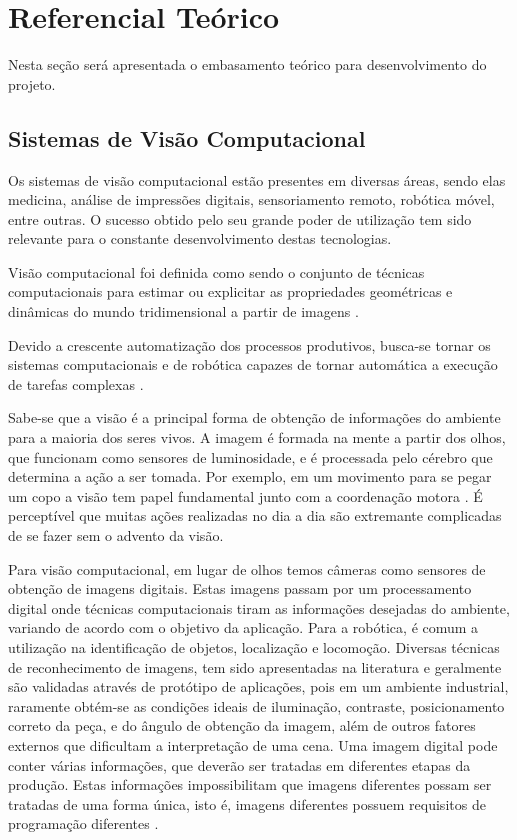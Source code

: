 \chapter{Referencial Teórico}
\label{chap:refteorico}

Nesta seção será apresentada o embasamento teórico para desenvolvimento do projeto.

\section{Sistemas de Visão Computacional}
\label{sec:sistemasVisaoArtificial}

Os sistemas de visão computacional estão presentes em diversas áreas, sendo elas medicina, análise de impressões digitais, sensoriamento remoto, robótica móvel, entre outras. O sucesso obtido pelo seu grande poder de utilização tem sido relevante para o constante desenvolvimento destas tecnologias.

Visão computacional foi definida como sendo o conjunto de técnicas computacionais para estimar ou explicitar as propriedades geométricas e dinâmicas do mundo tridimensional a partir de imagens \cite{alves2005estudo}.

Devido a crescente automatização dos processos produtivos, busca-se tornar os sistemas computacionais e de robótica capazes de tornar automática a execução de tarefas complexas \cite{rudek2001visao}.

Sabe-se que a visão é a principal forma de obtenção de informações do ambiente para a maioria dos seres vivos. A imagem é formada na mente a partir dos olhos, que funcionam como sensores de luminosidade, e é processada pelo cérebro que determina a ação a ser tomada. Por exemplo, em um movimento para se pegar um copo a visão tem papel fundamental junto com a coordenação motora \cite{alves2005estudo}. É perceptível que muitas ações realizadas no dia a dia são extremante complicadas de se fazer sem o advento da visão.

Para visão computacional, em lugar de olhos temos câmeras como sensores de obtenção de imagens digitais. Estas imagens passam por um processamento digital onde técnicas computacionais tiram as informações desejadas do ambiente, variando de acordo com o objetivo da aplicação. Para a robótica, é comum a utilização na identificação de objetos, localização e locomoção. Diversas técnicas de reconhecimento de imagens, tem sido apresentadas na literatura e geralmente são validadas através de protótipo de aplicações, pois em um ambiente industrial, raramente obtém-se as condições ideais de iluminação, contraste, posicionamento correto da peça, e do ângulo de obtenção da imagem, além de outros fatores externos que dificultam a interpretação de uma cena. Uma imagem digital pode conter várias informações, que deverão ser tratadas em diferentes etapas da produção. Estas informações impossibilitam que imagens diferentes possam ser tratadas de uma forma única, isto é, imagens diferentes possuem requisitos de programação diferentes \cite{rudek2001visao}.


